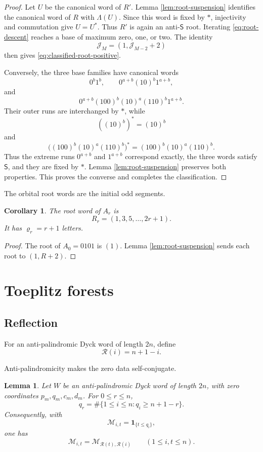 \documentclass[11pt]{article}
\newtheorem{lemma}[theorem]{Lemma}
\newtheorem{corollary}[theorem]{Corollary}
\theoremstyle{definition}
\theoremstyle{remark}
\newcommand{\Star}{*}
\newcommand{\Lam}{\Lambda}
\begin{document}
\begin{proof}
Let \(U\) be the canonical word of \(R'\).  Lemma
\ref{lem:root-suspension} identifies the canonical word of \(R\) with
\(\Lam(U)\).  Since this word is fixed by \(\Star\), injectivity and
commutation give \(U=U^{\Star}\).  Thus \(R'\) is again an anti-\(\mathsf S\)
root.  Iterating \eqref{eq:root-descent} reaches a base of maximum zero, one,
or two.  The identity
\[
 \mathcal J_M=(1,\mathcal J_{M-2}+2)
\]
then gives \eqref{eq:classified-root-positive}.

Conversely, the three base families have canonical words
\[
 0^b1^b,
 \qquad
 0^{a+b}(10)^b1^{a+b},
\]
and
\[
 0^{a+b}(100)^b(10)^a(110)^b1^{a+b}.
\]
Their outer runs are interchanged by \(\Star\), while
\[
 ((10)^b)^{\Star}=(10)^b
\]
and
\[
 \bigl((100)^b(10)^a(110)^b\bigr)^{\Star}
 =(100)^b(10)^a(110)^b.
\]
Thus the extreme runs \(0^{a+b}\) and \(1^{a+b}\) correspond exactly, the
three words satisfy \(\mathsf S\), and they are fixed by \(\Star\).  Lemma
\ref{lem:root-suspension} preserves both properties.  This proves the
converse and completes the classification.
\end{proof}

The orbital root words are the initial odd segments.
\begin{corollary}
\label{cor:orbital-roots}
The root word of \(A_r\) is
\begin{equation*}
 R_r=(1,3,5,\ldots,2r+1).
\end{equation*}
It has \(\varrho_r=r+1\) letters.
\end{corollary}

\begin{proof}
The root of \(A_0=0101\) is \((1)\).  Lemma
\ref{lem:root-suspension} sends each root to \((1,R+2)\).
\end{proof}

\section{Toeplitz forests}

\subsection{Reflection}

For an anti-palindromic Dyck word of length \(2n\), define
\[
 \mathcal R(i)=n+1-i.
\]

Anti-palindromicity makes the zero data self-conjugate.
\begin{lemma}
Let \(W\) be an anti-palindromic Dyck word of length \(2n\), with zero
coordinates \(p_m,q_m,c_m,d_m\).
For \(0\leq r\leq n\),
\begin{equation}
\label{eq:self-conjugate}
 q_r=\#\{1\leq i\leq n:q_i\geq n+1-r\}.
\end{equation}
Consequently, with
\[
 \mathcal M_{i,t}=\mathbf1_{\{t\leq q_i\}},
\]
one has
\begin{equation}
\label{eq:incidence-centro}
 \mathcal M_{i,t}=\mathcal M_{\mathcal R(t),\mathcal R(i)}
 \qquad(1\leq i,t\leq n).
\end{equation}
\end{lemma}
\end{document}
